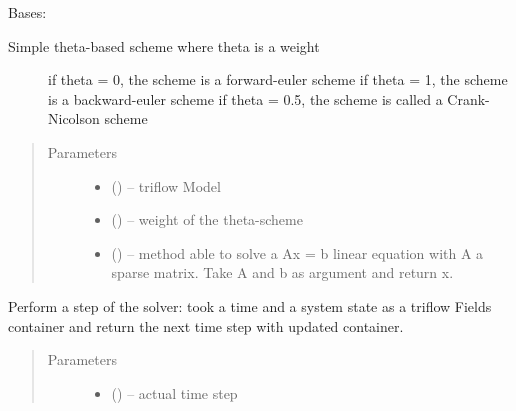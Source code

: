 \documentclass[letterpaper,10pt,english]{sphinxmanual}
\begin{document}
\begin{fulllineitems}
\label{\detokenize{triflow.plugins:triflow.plugins.schemes.Theta}}
Bases: 
\begin{description}
\item[{Simple theta-based scheme where theta is a weight}] \leavevmode
if theta = 0, the scheme is a forward-euler scheme
if theta = 1, the scheme is a backward-euler scheme
if theta = 0.5, the scheme is called a Crank-Nicolson scheme

\end{description}
\begin{quote}\begin{description}
\item[{Parameters}] \leavevmode\begin{itemize}
\item {} 
 () -- triflow Model

\item {} 
 (\sphinxstyleliteralemphasis{, }\sphinxstyleliteralemphasis{, }) -- weight of the theta-scheme

\item {} 
 (\sphinxstyleliteralemphasis{, }\sphinxstyleliteralemphasis{, }) -- method able to solve a Ax = b linear equation with A a sparse matrix. Take A and b as argument and return x.

\end{itemize}

\end{description}\end{quote}

\begin{fulllineitems}
\label{\detokenize{triflow.plugins:triflow.plugins.schemes.Theta.__call__}}
Perform a step of the solver: took a time and a system state as a
triflow Fields container and return the next time step with updated
container.
\begin{quote}\begin{description}
\item[{Parameters}] \leavevmode\begin{itemize}
\item {} 
 () -- actual time step


\end{itemize}
\end{description}
\end{quote}
\end{fulllineitems}
\end{fulllineitems}
\end{document}

